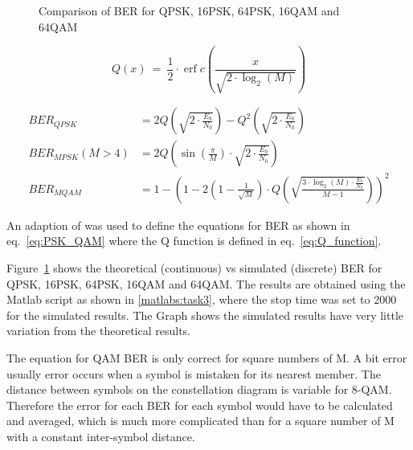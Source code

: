 \begin{figure}[ht!]
    \begin{center}
        
        \caption{Comparison of BER for QPSK, 16PSK, 64PSK, 16QAM and 64QAM}
    \end{center}\label{fig:3}
\end{figure}

\tiny

\begin{equation} \label{eq:Q_function}
    Q\left(x\right)\ =\ \frac{1}{2}\cdot\operatorname{erf}c\left(\frac{x}{\sqrt{2\cdot\log_{2}\left(M\right)}}\right)
\end{equation}

\begin{equation}\label{eq:PSK_QAM}
    \begin{split}
        BER_{QPSK}&=2Q\left(\sqrt{2\cdot\frac{E_{b}}{N_{0}}}\right)-Q^{2}\left(\sqrt{2\cdot\frac{E_{b}}{N_{0}}}\right)\\
        BER_{MPSK}\left(M>4\right)&=2Q\left(\sin\left(\frac{\pi}{M}\right)\cdot\sqrt{2\cdot\frac{E_{b}}{N_{0}}}\right)\\
        BER_{MQAM}&=1-\left(1-2\left(1-\frac{1}{\sqrt{M}}\right)\cdot Q\left(\sqrt{\frac{3\cdot\log_{2}\left(M\right)\cdot\frac{E_{b}}{N_{0}}}{M-1}}\right)\right)^{2}
    \end{split}
\end{equation}

\normalsize

An adaption of \cite{Mathuranathan2020Nov} was used to define the equations for BER as shown in eq.~\eqref{eq:PSK_QAM} where the Q function is defined in eq.~\eqref{eq:Q_function}. 

Figure~\ref{fig:3} shows the theoretical (continuous) vs simulated (discrete) BER for QPSK, 16PSK, 64PSK, 16QAM and 64QAM. The results are obtained using the Matlab script as shown in \ref{matlabs:task3}, where the stop time was set to 2000 for the simulated results. The Graph shows the simulated results have very little variation from the theoretical results.

The equation for QAM BER is only correct for square numbers of M. A bit error usually error occurs when a symbol is mistaken for its nearest member. The distance between symbols on the constellation diagram is variable for 8-QAM. Therefore the error for each BER for each symbol would have to be calculated and averaged, which is much more complicated than for a square number of M with a constant inter-symbol distance.